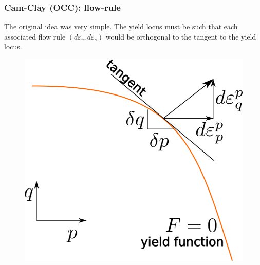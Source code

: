 \documentclass[notes]{beamer}
\begin{document}
\begin{frame}
\frametitle{Cam-Clay (OCC): flow-rule}
The original idea was very simple. The yield locus must be such that each associated flow rule $(d\varepsilon_v, d \varepsilon_s)$ would be orthogonal to the tangent to the yield locus.

\noindent
\fboxsep=0pt
\noindent
\begin{minipage}[t]{0.65\linewidth}
	
\end{minipage}%
\hfill
\begin{minipage}[t]{0.35\linewidth}
	\begin{figure}
		\includegraphics[width=\textwidth]{figs/flow-rule.png}
	\end{figure}
\end{minipage}
\end{frame}
\end{document}
